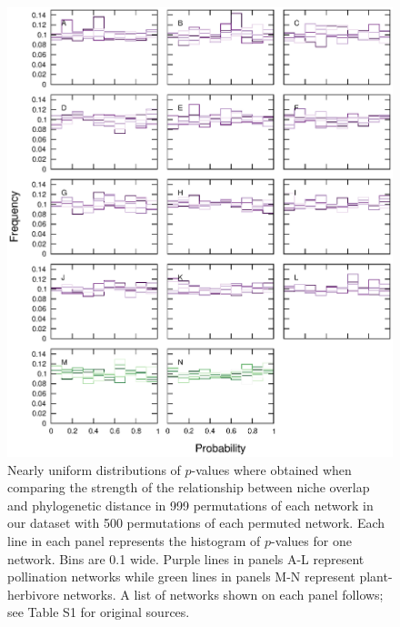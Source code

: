 \documentclass[12pt]{article}
\begin{document}
\begin{spacing}{1.5}
    \begin{figure}[!h]
        \begin{center}
          \centerline{\includegraphics*[width=.99\textwidth]{Figures/random_p_distributions.eps}}
        \end{center}
        \vspace{-1cm}
         \caption{\small Nearly uniform distributions of $p$-values where obtained when comparing the strength of the relationship between niche overlap and phylogenetic distance in 999 permutations of each network in our dataset with 500 permutations of each permuted network. Each line in each panel represents the histogram of $p$-values for one network. Bins are 0.1 wide. Purple lines in panels A-L represent pollination networks while green lines in panels M-N represent plant-herbivore networks. A list of networks shown on each panel follows; see Table S1 for original sources.
}
\end{figure}
\end{spacing}
\end{document}
